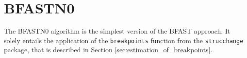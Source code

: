 \section{BFASTN0}
\label{sec:bfast0n}
The BFASTN0 algorithm is the simplest version of the BFAST approach. It solely entails
the application of the \texttt{breakpoints} function from the
\texttt{strucchange} package, that is described in Section \ref{sec:estimation_of_breakpoints}.
